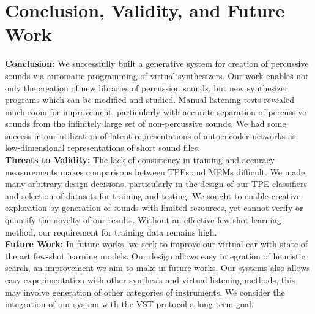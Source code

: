 \documentclass[runningheads,a4paper]{llncs}
\begin{document}

\section{Conclusion, Validity, and Future Work} 
\textbf{Conclusion:} We successfully built a generative system for creation of percussive sounds via automatic programming of virtual synthesizers.  
Our work enables not only the creation of new libraries of percussion sounds, but new synthesizer programs which can be modified and studied. 
Manual listening tests revealed much room for improvement, particularly with accurate separation of percussive sounds from the infinitely large set of non-percussive sounds. We had some success in our utilization of latent representations of autoencoder networks as low-dimensional representations of short sound files. \\
\textbf{Threats to Validity:} The lack of consistency in training and accuracy measurements makes comparisons between TPEs and MEMs difficult. We made many arbitrary design decisions, particularly in the design of our TPE classifiers and selection of datasets for training and testing. We sought to enable creative exploration by generation of sounds with limited resources, yet cannot verify or quantify the novelty of our results. Without an effective few-shot learning method, our requirement for training data remains high.\\  
\textbf{Future Work:} In future works, we seek to improve our virtual ear with state of the art few-shot learning models. Our design allows easy integration of heuristic search, an improvement we aim to make in future works. Our systems also allows easy experimentation with other synthesis and virtual listening methods, this may involve generation of other categories of instruments. We consider the integration of our system with the VST protocol a long term goal. 




\end{document}
